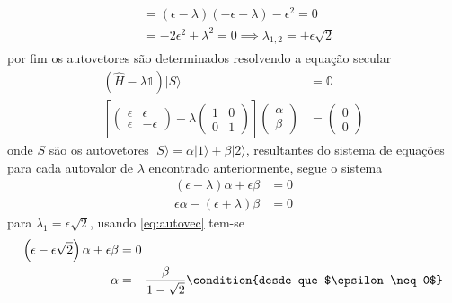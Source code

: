 \begin{prob}
\begin{sol}
\begin{enumerate}[label=\alph *)]
\begin{align}
\begin{split}
																														&= \left(\epsilon-\lambda\right)(-\epsilon-\lambda)-\epsilon^{2}=0\\
																														&=-2\epsilon^{2}+\lambda^{2}=0\implies \boxed{\lambda_{1,2}=\pm \epsilon\sqrt{2}}
							\end{split}
						\end{align}
						por fim os autovetores são determinados resolvendo a equação secular
						\begin{align}
							\left(\hat{H}-\lambda\mathbb{1}\right)|{S}\rangle&=\mathbb{0}\\
							\left[
								\begin{pmatrix}
									\epsilon & \epsilon \\
									\epsilon & -\epsilon
								\end{pmatrix}-
								\lambda
								\begin{pmatrix}
									1 & 0 \\
									0 & 1
								\end{pmatrix}
							\right]
							\begin{pmatrix}
								\alpha \\
								\beta
							\end{pmatrix}&=
							\begin{pmatrix}
								0 \\
								0
							\end{pmatrix}
						\end{align}
						onde $S$ são os autovetores $|{S}\rangle=\alpha |{1}\rangle+\beta |{2}\rangle$, resultantes do sistema de equações para cada autovalor de $\lambda$ encontrado anteriormente, segue o sistema
						\begin{subequations}
							\begin{align}
								\left(\epsilon-\lambda\right) \alpha+\epsilon \beta &= 0 \label{eq:autovec}\\
								\epsilon \alpha-\left(\epsilon+\lambda\right)\beta &= 0
							\end{align}
						\end{subequations}
						para $\lambda_{1}=\epsilon \sqrt{2}$, usando \eqref{eq:autovec} tem-se
						\begin{align}
							\begin{split}
								\left(\epsilon-\epsilon \sqrt{2}\right) \alpha+\epsilon \beta &= 0\\
								\alpha &= -\frac{\beta}{1-\sqrt{2}}\condition{desde que $\epsilon\neq 0$}
							\end{split}

\end{align}
\end{enumerate}
\end{sol}
\end{prob}
